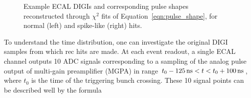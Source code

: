 \begin{figure}[htbp]
  \centering
  \caption{
    Example ECAL DIGIs and corresponding pulse shapes reconstructed through $\chi^{2}$ fits of Equation~\ref{eqn:pulse_shape}, for normal (left) and spike-like (right) hits.
  }
  \label{fig:pulse_examples}
\end{figure}

To understand the time distribution, one can investigate the original DIGI samples from which rec hits are made. 
At each event readout, a single ECAL channel outputs 10 ADC signals corresponding to a sampling of the analog pulse output of multi-gain preamplifier (MGPA) in range $t_{0} - 125\, \text{ns} < t < t_{0} + 100\, \text{ns}$, where $t_{0}$ is the time of the triggering bunch crossing. 
These 10 signal points can be described well by the formula

